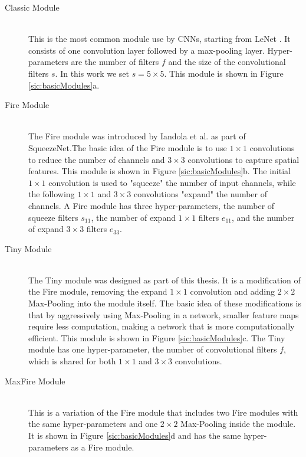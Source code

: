 \begin{description}
	\item[Classic Module] \hfill \\
		This is the most common module use by CNNs, starting from LeNet \cite[-4em]{lecun1998gradient}. It consists of one convolution layer followed by a max-pooling layer. Hyper-parameters are the number of filters $f$ and the size of the convolutional filters $s$. In this work we set $s = 5 \times 5$. This module is shown in Figure \ref{sic:basicModules}a.
		
	\item[Fire Module] \hfill \\
		The Fire module was introduced by Iandola et al. \cite{iandola2016squeezenet} as part of SqueezeNet.The basic idea of the Fire module is to use $1 \times 1$ convolutions to reduce the number of channels and $3 \times 3$ convolutions to capture spatial features. This module is shown in Figure \ref{sic:basicModules}b. The initial $1 \times 1$ convolution is used to "squeeze" the number of input channels, while the following $1 \times 1$ and $3 \times 3$ convolutions "expand" the number of channels.
		A Fire module has three hyper-parameters, the number of squeeze filters $s_{11}$, the number of expand $1 \times 1$ filters $e_{11}$, and the number of expand $3 \times 3$ filters $e_{33}$.
		
	\item[Tiny Module] \hfill \\
		The Tiny module was designed as part of this thesis. It is a modification of the Fire module, removing the expand $1 \times 1$ convolution and adding $2 \times 2$ Max-Pooling into the module itself. The basic idea of these modifications is that by aggressively using Max-Pooling in a network, smaller feature maps require less computation, making a network that is more computationally efficient. This module is shown in Figure \ref{sic:basicModules}c.
		The Tiny module has one hyper-parameter, the number of convolutional filters $f$, which is shared for both $1 \times 1$ and $3 \times 3$ convolutions.
		
	\item[MaxFire Module] \hfill \\
	This is a variation of the Fire module that includes two Fire modules with the same hyper-parameters and one $2 \times 2$ Max-Pooling inside the module. It is shown in Figure \ref{sic:basicModules}d and has the same hyper-parameters as a Fire module.
\end{description}
